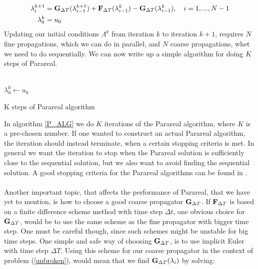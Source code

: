 \begin{align}
\lambda_{i}^{k+1} &= \bold G_ {\Delta T}(\lambda_{i-1}^{k+1})+\bold F_ {\Delta T}( \lambda_{i-1}^{k})-\bold G_ {\Delta T}( \lambda_{i-1}^{k}), \quad i=1,...,N-1 \label{pred_corr_PR} \\
\lambda_0^k &= u_0
\end{align}
Updating our initial conditions $\Lambda^k$ from iteration $k$ to iteration $k+1$, requires $N$ fine propagations, which we can do in parallel, and $N$ coarse propagations, whet we need to do sequentially. We can now write up a simple algorithm for doing $K$ steps of Parareal.
\\
\\
\begin{algorithm}[H]
$\lambda^0_0\leftarrow u_0$\;
\caption{K steps of Parareal algorithm\label{P_ALG}}
\end{algorithm}
\noindent
In algorithm \ref{P_ALG} we do $K$ iterations of the Parareal algorithm, where $K$ is a pre-chosen number. If one wanted to construct an actual Parareal algorithm, the iteration should instead terminate, when a certain stopping criteria is met. In general we want the iteration to stop when the Parareal solution is sufficiently close to the sequential solution, but we also want to avoid finding the sequential solution. A good stopping criteria for the Parareal algorithms can be found in \cite{lepsa2010efficient}.
\\
\\
Another important topic, that affects the performance of Parareal, that we have yet to mention, is how to choose a good coarse propagator $\bold G_{\Delta T}$. If $\bold F_{\Delta T}$ is based on a finite difference scheme method with time step $\Delta t$, one obvious choice for $\bold G_{\Delta T}$, would be to use the same scheme as the fine propagator with bigger time step. One must be careful though, since such schemes might be unstable for big time steps. One simple and safe way of choosing $\bold G_{\Delta T}$, is to use implicit Euler with time step $\Delta T$. Using this scheme for our coarse propagator in the context of problem (\ref{unbroken}), would mean that we find $\bold{G}_{\Delta T}(\lambda_i)$ by solving:

